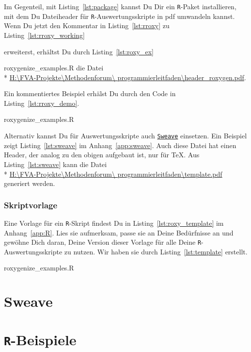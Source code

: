 \documentclass[twoside]{scrartcl}
\providecommand{\R}{\texttt{R}}
\providecommand{\code}[1]{\texttt{#1}}
\providecommand{\proot}{%
H:\textbackslash{}FVA-Projekte\textbackslash{}Methodenforum\textbackslash{}%
}
\providecommand{\pdir}{\proot{}programmierleitfaden\textbackslash{}}
\begin{document}
Im Gegenteil, mit Listing~\ref{lst:package} kannst Du Dir ein \R{}-Paket
installieren, mit dem Du 
Dateiheader 
f\"u{}r \R{}-Auswertungsskripte in pdf 
umwandeln
kannst.
Wenn Du jetzt den Kommentar in  Listing~\ref{lst:rroxy} zu
Listing~\ref{lst:rroxy_working} 

erweiterst, erh\"altst Du durch
Listing~\ref{lst:roxy_ex} 

{roxygenize_examples.R} die Datei \\*
\href{%
header_roxygen.pdf}{%
\pdir{}header\_roxygen.pdf}.  

Ein kommentiertes Beispiel erh\"a{}lst Du
durch den Code in Listing~\ref{lst:rroxy_demo}. 

{roxygenize_examples.R}

 Alternativ kannst Du f\"u{}r 
Auswertungsskripte auch
\href{http://www.stat.uni-muenchen.de/~leisch/Sweave/}{\code{Sweave}} einsetzen.
Ein Beispiel zeigt Listing~\ref{lst:sweave} im
Anhang~\ref{app:sweave}.
Auch diese Datei hat einen Header, der analog zu den obigen aufgebaut ist, nur
f\"u{}r \TeX{}.
Aus  Listing~\ref{lst:sweave} kann die Datei \\* 
\href{%
template.pdf}{%
\pdir{}template.pdf}  
generiert werden.

\subsubsection{Skriptvorlage
 }
Eine Vorlage f\"ur ein \R{}-Skript findest Du in Listing~\ref{lst:roxy_template}
im Anhang~\ref{app:R}. 
Lies sie aufmerksam, passe sie an Deine Bed\"u{}rfnisse an und gew\"o{}hne Dich
daran, Deine Version dieser Vorlage f\"u{}r alle Deine \R{}-Auswertungsskripte
zu nutzen.
Wir haben sie durch Listing~\ref{lst:template} erstellt.

{roxygenize_examples.R}




\printindex
\appendix
\section{Sweave\label{app:sweave}}

\pagebreak
\section{\R{}-Beispiele\label{app:R}}

%
%
%
\end{document}

